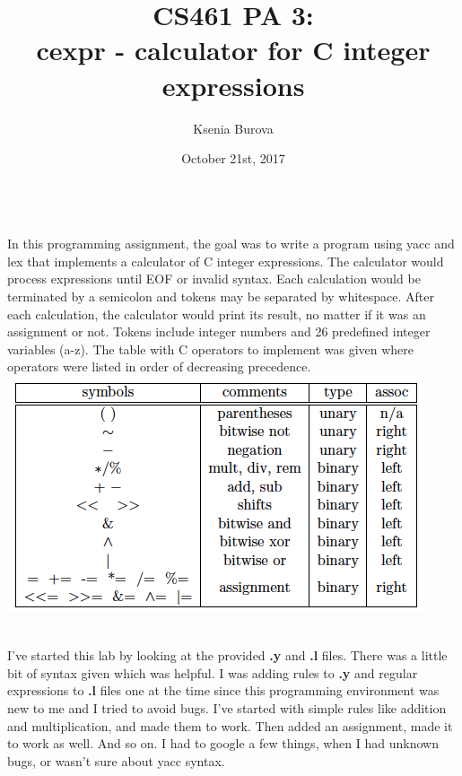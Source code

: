 \documentclass[12pt, letterpaper]{article}
\title{CS461 PA 3: \\cexpr - calculator for C integer expressions }
\author{Ksenia Burova}
\date{October 21st, 2017}
\begin{document}
 
\maketitle

\\
In this programming assignment, the goal was to write a program using yacc and lex that implements a calculator of C integer expressions.  
The calculator would process expressions until  EOF or invalid syntax. Each calculation would be terminated by a semicolon and tokens may be separated by whitespace. After each calculation, the calculator would print its result, no matter if it was an assignment or not. Tokens include integer
numbers and 26 predefined integer variables (a-z). The table with C operators to implement was given where operators were listed in order of decreasing precedence. \\
	\includegraphics[scale=0.6]{1.png}

\\
I've started this lab by looking at the provided {\bf .y} and {\bf .l} files. There was a little bit of syntax given which was helpful. I was adding rules to  {\bf .y} and  regular expressions to {\bf .l} files one at the time since this programming environment was new to me and I tried to avoid bugs. I've started with simple rules like addition and multiplication, and made them to work. Then added an assignment, made it to work as well. And so on. I had to google a few things, when I had unknown bugs, or wasn't sure about yacc syntax.
\end{document}
